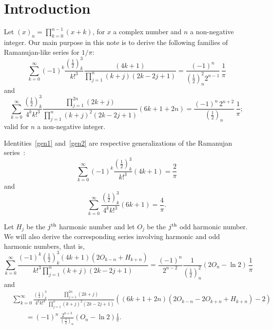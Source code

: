 \documentclass[12pt,reqno]{article}
\begin{document}
\section{Introduction}
Let $\left( x \right)_n  = \prod_{k = 0}^{n - 1} {\left( {x + k} \right)} $, for $x$ a complex number and $n$ a non-negative integer. Our main purpose in this note is to derive the following families of Ramanujan-like series for $1/\pi$:
\begin{equation}\label{gen1}
\sum_{k = 0}^\infty  {( - 1)^k \frac{{\left( {\frac{1}{2}} \right)_k^3 }}{{k!^3 }}\frac{{\left( {4k + 1} \right)}}{{\prod_{j = 1}^n {\left( {k + j} \right)\left( {2k - 2j + 1} \right)} }}}  = \frac{{( - 1)^n }}{{\left( {\frac{1}{2}} \right)_n^2 2^{n - 1} }}\,\frac{1}{\pi }
\end{equation}
and
\begin{equation}\label{gen2}
\sum_{k = 0}^\infty  {\frac{{\left( {\frac{1}{2}} \right)_k^3 }}{{4^k k!^3 }}\frac{{\prod_{j = 1}^{2n} {\left( {2k + j} \right)} }}{{\prod_{j = 1}^n {\left( {k + j} \right)^2 \left( {2k - 2j + 1} \right)} }}\left( {6k + 1 + 2n} \right)}  = \frac{{( - 1)^n\,2^{n+2} }}{{\left( {\frac{1}{2}} \right)_n }}\, \frac1{\pi };
\end{equation}
valid for $n$ a non-negative integer.

Identities~\eqref{gen1} and~\eqref{gen2} are respective generalizations of the Ramanujan series~\cite{ramanujan14}:
\begin{equation}\label{bauer}
\sum_{k = 0}^\infty  {( - 1)^k \frac{{\left( \frac12 \right)_k^3 }}{{k!^3 }}\left( {4k + 1} \right)}  = \frac{2}{\pi }
\end{equation}
and
\begin{equation}
\sum_{k = 0}^\infty  {\frac{{\left( {\frac{1}{2}} \right)_k^3 }}{{4^k k!^3 }}\left( {6k + 1} \right)}  = \frac{4}{\pi }.
\end{equation}

Let $H_j$ be the $j^{\rm th}$ harmonic number and let $O_j$ be the $j^{\rm th}$ odd harmonic number. We will also derive the corresponding series involving harmonic and odd harmonic numbers, that is,
\begin{equation}\label{di4jyj5}
\sum_{k = 0}^\infty  {\frac{{( - 1)^k \left( {\frac{1}{2}} \right)_k^3 \left( {4k + 1} \right)\left( {2O_{k - n}  + H_{k + n} } \right)}}{{k!^3 \prod_{j = 1}^n {\left( {k + j} \right)\left( {2k - 2j + 1} \right)} }}}  = \frac{{( - 1)^n }}{{2^{n - 2} }}\frac{1}{{\left( {\frac{1}{2}} \right)_n^2 }}\left( {2O_n  - \ln 2} \right)\,\frac{1}{\pi }
\end{equation}
and
\begin{align}\label{z75f5e1}
&\sum_{k = 0}^\infty  {\frac{{\left( {\frac{1}{2}} \right)_k^3 }}{{4^k k!^3 }}\frac{{\prod_{j = 1}^{2n} {\left( {2k + j} \right)} }}{{\prod_{j = 1}^n {\left( {k + j} \right)^2 \left( {2k - 2j + 1} \right)} }}\left( {\left( {6k + 1 + 2n} \right)\left( {2O_{k - n}  - 2O_{k + n}  + H_{k + n} } \right) - 2} \right)}\nonumber\\
&\qquad  = ( - 1)^n\,\frac{{2^{n + 3} }}{{\left( {\frac{1}{2}} \right)_n }}\left( {O_n  - \ln 2} \right)\frac{1}{\pi }.
\end{align}
\end{document}
